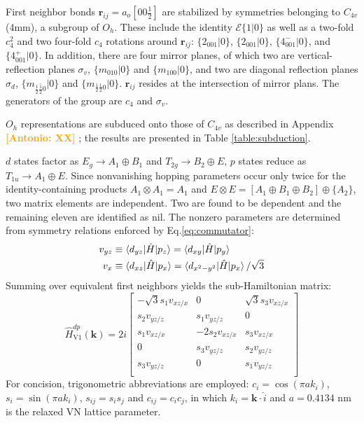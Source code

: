 \documentclass[twocolumn,showpacs,preprintnumbers,superscriptaddress,prb,floatfix,aps,10pt]{revtex4-1}
\newcommand{\abmei}[1]{\textcolor{orange}{ \bf [Antonio: #1] }}
\renewcommand{\vec}[1]{\ensuremath{\mathbf{#1}}}
\newcommand*{\ham}{\hat{H}}
\newcommand*{\id}{\mathcal{E}}
\newcommand*{\bondvec}{\vec{r}_{ij}}
\newcommand{\seitz}[2]{\{#1|#2\}}
\begin{document}
First neighbor bonds $\bondvec = a_o[00\frac{1}{2}]$ are stabilized by symmetries belonging to $C_{4v}$ (4mm), a subgroup of $O_h$. These include the identity $\id \seitz{1}{0}$ as well as a two-fold $c_{4}^2$ and two four-fold $c_{4}$ rotations around $\bondvec$: $\seitz{2_{001}}{0}$, $\seitz{2_{001}}{0}$, $\seitz{4^-_{001}}{0}$, and $\seitz{4^+_{001}}{0}$. In addition, there are four mirror planes, of which two are vertical-reflection planes $\sigma_v$, $\seitz{m_{010}}{0}$ and $\seitz{m_{100}}{0}$, and two are diagonal reflection planes $\sigma_d$, $\seitz{m_{\frac{1}{2}\bar{\frac{1}{2}}0}}{0}$ and $\seitz{m_{\frac{1}{2}\frac{1}{2}0}}{0}$. $\bondvec$ resides at the intersection of mirror plans. The generators of the group are $c_4$ and $\sigma_v$. 

$O_h$ representations are subduced onto those of $C_{4v}$ as described in Appendix \abmei{XX}; the results are presented in Table \ref{table:subduction}. 



$d$ states factor as $E_g \rightarrow A_1 \oplus B_1$ and $T_{2g} \rightarrow B_2 \oplus E$, $p$ states reduce as $T_{1u} \rightarrow A_1 \oplus E$. Since nonvanishing hopping parameters occur only twice for the identity-containing products $A_1 \otimes A_1 = A_1$ and $E \otimes E = [ A_1 \oplus B_1 \oplus B_2 ] \oplus \{ A_2 \}$, two matrix elements are independent. Two are found to be dependent and the remaining eleven are identified as nil. The nonzero parameters are determined from symmetry relations enforced by Eq.\ref{eq:commutator}:
%
\begin{align}
v_{yz} &
\equiv \braket{d_{yz} | \ham | p_z} 
= \braket{d_{xy} | \ham | p_y} \\
v_{x} &
\equiv \braket{d_{xz} | \ham | p_x} 
= \braket{d_{x^2-y^2} | \ham | p_x} / \sqrt{3}
\end{align}
%
Summing over equivalent first neighbors yields the sub-Hamiltonian matrix:
%
\begin{equation}
\ham_{\textrm{V1}}^{dp}(\vec{k}) = 2i
\begin{bmatrix}
-\sqrt{3} s_1 v_{xz/x} & 0              & \sqrt{3} s_3 v_{xz/x}  \\
 s_2 v_{yz/z}          &  s_1 v_{yz/z}  &      0                 \\
 s_1 v_{xz/x}          &-2 s_2 v_{xz/x} &  s_3 v_{xz/x}          \\
      0                &  s_3 v_{yz/z}  &  s_2 v_{yz/z}          \\
 s_3 v_{yz/z}          & 0              &  s_1 v_{yz/z}          \\
\end{bmatrix}
\end{equation}
%
For concision, trigonometric abbreviations are employed: $c_i = \cos(\pi a k_i)$, $s_i = \sin(\pi a k_i)$, $s_{ij} = s_i s_j$ and $c_{ij} = c_i c_j$, in which $k_i = \vec{k}\cdot\hat{i}$ and $a = 0.4134$ nm is the relaxed VN lattice parameter. 
\end{document}
